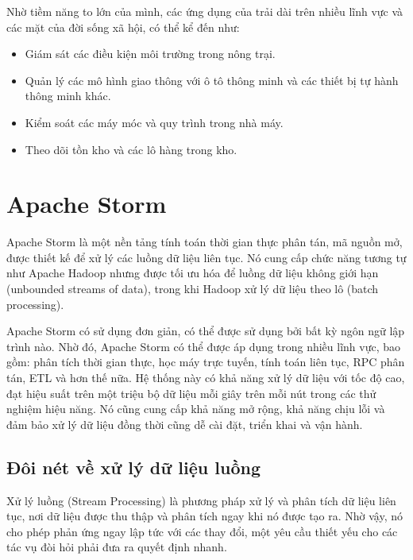 Nhờ tiềm năng to lớn của mình, các ứng dụng của  trải dài trên nhiều lĩnh vực và các mặt của đời sống xã hội, có thể kể đến như:

\begin{itemize}
    \item Giám sát các điều kiện môi trường trong nông trại.
    \item Quản lý các mô hình giao thông với ô tô thông minh và các thiết bị tự hành thông minh khác.
    \item Kiểm soát các máy móc và quy trình trong nhà máy.
    \item Theo dõi tồn kho và các lô hàng trong kho.
\end{itemize}

\section{Apache Storm}

Apache Storm \autocite{apachestorm} là một nền tảng tính toán thời gian thực phân tán, mã nguồn mở, được thiết kế để xử lý các luồng dữ liệu liên tục. Nó cung cấp chức năng tương tự như Apache Hadoop nhưng được tối ưu hóa để luồng dữ liệu không giới hạn (unbounded streams of data), trong khi Hadoop xử lý dữ liệu theo lô (batch processing).

Apache Storm có sử dụng đơn giản, có thể được sử dụng bởi bất kỳ ngôn ngữ lập trình nào. Nhờ đó, Apache Storm có thể được áp dụng trong nhiều lĩnh vực, bao gồm: phân tích thời gian thực, học máy trực tuyến, tính toán liên tục, RPC phân tán, ETL và hơn thế nữa. Hệ thống này có khả năng xử lý dữ liệu với tốc độ cao, đạt hiệu suất trên một triệu bộ dữ liệu mỗi giây trên mỗi nút trong các thử nghiệm hiệu năng. Nó cũng cung cấp khả năng mở rộng, khả năng chịu lỗi và đảm bảo xử lý dữ liệu đồng thời cũng dễ cài đặt, triển khai và vận hành.

\subsection{Đôi nét về xử lý dữ liệu luồng}

Xử lý luồng (Stream Processing)\autocite{rivery_batch_vs_stream} là phương pháp xử lý và phân tích dữ liệu liên tục, nơi dữ liệu được thu thập và phân tích ngay khi nó được tạo ra. Nhờ vậy, nó cho phép phản ứng ngay lập tức với các thay đổi, một yêu cầu thiết yếu cho các tác vụ đòi hỏi phải đưa ra quyết định nhanh.

